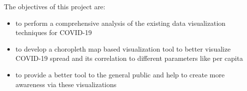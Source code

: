The objectives of this project are:
\begin{itemize}
  \item to perform a comprehensive analysis of the existing data visualization techniques for COVID-19
  \item to develop a choropleth map based visualization tool to better visualize COVID-19 spread and its correlation to different parameters like per capita
  \item to provide a better tool to the general public and help to create more awareness via these visualizations
\end{itemize}
